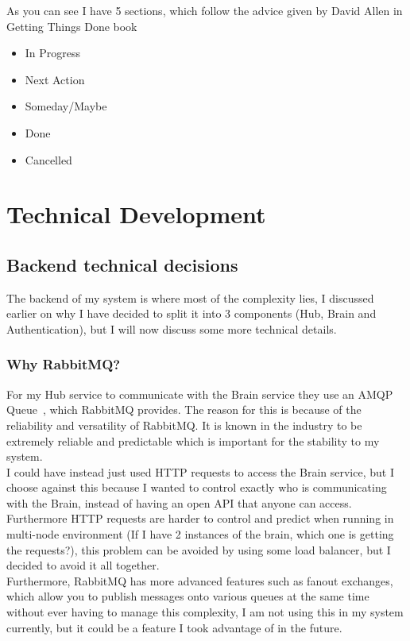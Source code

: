 \documentclass[titlepage]{article}
\begin{document}
As you can see I have 5 sections, which follow the advice given by David Allen in Getting Things Done book~\cite{gtd}

\begin{itemize}
  \item In Progress
  \item Next Action
  \item Someday/Maybe
  \item Done
  \item Cancelled
\end{itemize}

\pagebreak
\section{Technical Development}
\subsection{Backend technical decisions}
The backend of my system is where most of the complexity lies, I discussed earlier on why I have decided to split it into 3 components (Hub, Brain and Authentication), but I will now discuss some more technical details.

\subsubsection{Why RabbitMQ?}
For my Hub service to communicate with the Brain service they use an AMQP Queue~\cite{amqp}, which RabbitMQ provides. The reason for this is because of the reliability and versatility of RabbitMQ. It is known in the industry to be extremely reliable and predictable which is important for the stability to my system. \\

I could have instead just used HTTP requests to access the Brain service, but I choose against this because I wanted to control exactly who is communicating with the Brain, instead of having an open API that anyone can access. Furthermore HTTP requests are harder to control and predict when running in multi-node environment (If I have 2 instances of the brain, which one is getting the requests?), this problem can be avoided by using some load balancer, but I decided to avoid it all together. \\

Furthermore, RabbitMQ has more advanced features such as fanout exchanges, which allow you to publish messages onto various queues at the same time without ever having to manage this complexity, I am not using this in my system currently, but it could be a feature I took advantage of in the future.
\end{document}
